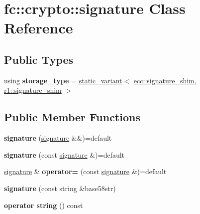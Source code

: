 \hypertarget{classfc_1_1crypto_1_1signature}{}\section{fc\+:\+:crypto\+:\+:signature Class Reference}
\label{classfc_1_1crypto_1_1signature}
\subsection*{Public Types}
\begin{DoxyCompactItemize}
\item 
\mbox{\label{classfc_1_1crypto_1_1signature_a4598d0d8b98ed7a27b4ad78e77915c03}} 
using {\bfseries storage\+\_\+type} = \mbox{\hyperlink{classfc_1_1static__variant}{static\+\_\+variant}}$<$ \mbox{\hyperlink{structfc_1_1ecc_1_1signature__shim}{ecc\+::signature\+\_\+shim}}, \mbox{\hyperlink{structfc_1_1crypto_1_1r1_1_1signature__shim}{r1\+::signature\+\_\+shim}} $>$
\end{DoxyCompactItemize}
\subsection*{Public Member Functions}
\begin{DoxyCompactItemize}
\item 
\mbox{\label{classfc_1_1crypto_1_1signature_a090abf4aadb475423381a20a127c8f74}} 
{\bfseries signature} (\mbox{\hyperlink{classfc_1_1crypto_1_1signature}{signature}} \&\&)=default
\item 
\mbox{\label{classfc_1_1crypto_1_1signature_af8e291ae6b3aa77b38c838a7a793f6cf}} 
{\bfseries signature} (const \mbox{\hyperlink{classfc_1_1crypto_1_1signature}{signature}} \&)=default
\item 
\mbox{\label{classfc_1_1crypto_1_1signature_a449f3916ce4476a361b5d682ff0f9658}} 
\mbox{\hyperlink{classfc_1_1crypto_1_1signature}{signature}} \& {\bfseries operator=} (const \mbox{\hyperlink{classfc_1_1crypto_1_1signature}{signature}} \&)=default
\item 
\mbox{\label{classfc_1_1crypto_1_1signature_acdfbb133ca46a49439e0c524a9d08cfc}} 
{\bfseries signature} (const string \&base58str)
\item 
\mbox{\label{classfc_1_1crypto_1_1signature_a79633fec2eeba107461f951496986be7}} 
{\bfseries operator string} () const
\end{DoxyCompactItemize}
